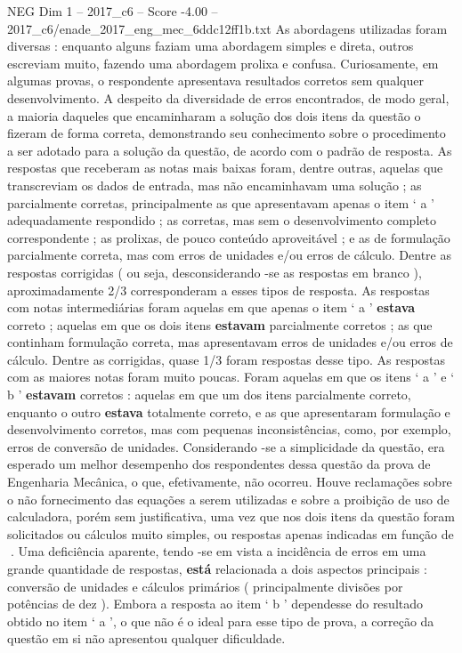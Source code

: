 \begin{textsample}{NEG Dim 1 – 2017\_c6 – Score -4.00 – 2017\_c6/enade\_2017\_eng\_mec\_6ddc12ff1b.txt}
As abordagens utilizadas foram diversas : enquanto alguns faziam uma abordagem simples e direta, outros escreviam muito, fazendo uma abordagem prolixa e confusa.
Curiosamente, em algumas provas, o respondente apresentava resultados corretos sem qualquer desenvolvimento.
A despeito da diversidade de erros encontrados, de modo geral, a maioria daqueles que encaminharam a solução dos dois itens da questão o fizeram de forma correta, demonstrando seu conhecimento sobre o procedimento a ser adotado para a solução da questão, de acordo com o padrão de resposta.
As respostas que receberam as notas mais baixas foram, dentre outras, aquelas que transcreviam os dados de entrada, mas não encaminhavam uma solução ; as parcialmente corretas, principalmente as que apresentavam apenas o item ‘ a ’ adequadamente respondido ; as corretas, mas sem o desenvolvimento completo correspondente ; as prolixas, de pouco conteúdo aproveitável ; e as de formulação parcialmente correta, mas com erros de unidades e/ou erros de cálculo.
Dentre as respostas corrigidas ( ou seja, desconsiderando -se as respostas em branco ), aproximadamente 2/3 corresponderam a esses tipos de resposta.
As respostas com notas intermediárias foram aquelas em que apenas o item ‘ a ’ \textbf{estava} correto ; aquelas em que os dois itens \textbf{estavam} parcialmente corretos ; as que continham formulação correta, mas apresentavam erros de unidades e/ou erros de cálculo.
Dentre as corrigidas, quase 1/3 foram respostas desse tipo.
As respostas com as maiores notas foram muito poucas.
Foram aquelas em que os itens ‘ a ’ e ‘ b ’ \textbf{estavam} corretos : aquelas em que um dos itens parcialmente correto, enquanto o outro \textbf{estava} totalmente correto, e as que apresentaram formulação e desenvolvimento corretos, mas com pequenas inconsistências, como, por exemplo, erros de conversão de unidades.
Considerando -se a simplicidade da questão, era esperado um melhor desempenho dos respondentes dessa questão da prova de Engenharia Mecânica, o que, efetivamente, não ocorreu.
Houve reclamações sobre o não fornecimento das equações a serem utilizadas e sobre a proibição de uso de calculadora, porém sem justificativa, uma vez que nos dois itens da questão foram solicitados ou cálculos muito simples, ou respostas apenas indicadas em função de .
Uma deficiência aparente, tendo -se em vista a incidência de erros em uma grande quantidade de respostas, \textbf{está} relacionada a dois aspectos principais : conversão de unidades e cálculos primários ( principalmente divisões por potências de dez ).
Embora a resposta ao item ‘ b ’ dependesse do resultado obtido no item ‘ a ’, o que não é o ideal para esse tipo de prova, a correção da questão em si não apresentou qualquer dificuldade.

\end{textsample}
